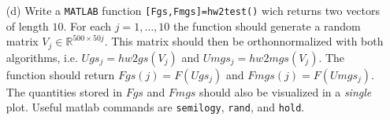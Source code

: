 \documentclass[10pt]{report}
\begin{document}
\begin{enumerate}
\begin{enumerate}
    \item[(d)] Write a \verb+MATLAB+ function \verb+[Fgs,Fmgs]=hw2test()+ wich
    returns two vectors of length $10$. For each $j=1,\ldots,10$ the function
    should generate a random matrix $V_j\in\mathbb{R}^{500\times50j}$. This
    matrix should then be orthonnormalized with both algorithms, i.e.
    $Ugs_j=hw2gs(V_j)$ and $Umgs_j=hw2mgs(V_j)$. The function should return
    $Fgs(j)=F(Ugs_j)$ and $Fmgs(j)=F(Umgs_j)$. The quantities stored in $Fgs$
    and $Fmgs$ should also be visualized in a \textit{single} plot. Useful
    matlab commands are \verb+semilogy+, \verb+rand+, and \verb+hold+.

  \end{enumerate}







  \end{enumerate}
\end{document}
